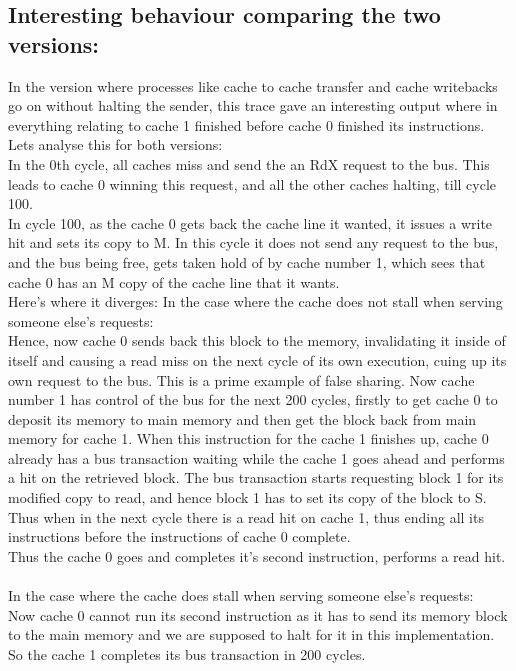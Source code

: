 \documentclass{article}
\begin{document}
\subsection{Interesting behaviour comparing the two versions:}
In the version where processes like cache to cache transfer and cache writebacks go on without halting the sender, this trace gave an interesting output where in everything relating to cache 1 finished before cache 0 finished its instructions.\\
Lets analyse this for both versions: \\
In the 0th cycle, all caches miss and send the an RdX request to the bus. This leads to cache 0 winning this request, and all the other caches halting, till cycle 100.\\
In cycle 100, as the cache 0 gets back the cache line it wanted, it issues a write hit and sets its copy to M. In this cycle it does not send any request to the bus, and the bus being free, gets taken hold of by cache number 1, which sees that cache 0 has an M copy of the cache line that it wants. \\
Here's where it diverges:
In the case where the cache does not stall when serving someone else's requests: \\
Hence, now cache 0 sends back this block to the memory, invalidating it inside of itself and causing a read miss on the next cycle of its own execution, cuing up its own request to the bus. This is a prime example of false sharing. Now cache number 1 has control of the bus for the next 200 cycles, firstly to get cache 0 to deposit its memory to main memory and then get the block back from main memory for cache 1.
When this instruction for the cache 1 finishes up, cache 0 already has a bus transaction waiting while the cache 1 goes ahead and performs a hit on the retrieved block. The bus transaction starts requesting block 1 for its modified copy to read, and hence block 1 has to set its copy of the block to S. Thus when in the next cycle there is a read hit on cache 1, thus ending all its instructions before the instructions of cache 0 complete.\\
Thus the cache 0 goes and completes it's second instruction, performs a read hit.\\
\\
In the case where the cache does stall when serving someone else's requests:\\
Now cache 0 cannot run its second instruction as it has to send its memory block to the main memory and we are supposed to halt for it in this implementation. So the cache 1 completes its bus transaction in 200 cycles.\\
\end{document}
